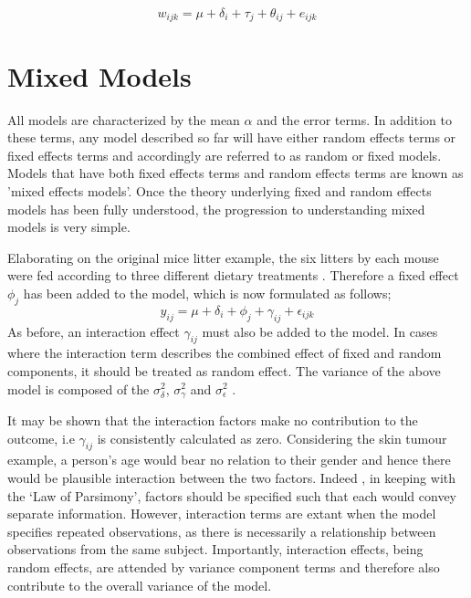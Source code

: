 \documentclass[12pt, a4paper]{report}
\theoremstyle{plain}
\theoremstyle{definition}
\theoremstyle{remark}
\begin{document}
\begin{equation}
w_{ijk} = \mu + \delta_{i} + \tau_{j} + \theta_{ij} + e_{ijk}
\end{equation}

\section{Mixed Models}


All models are characterized by the mean $\alpha$ and the error
terms. In addition to these terms, any model described so far will
have either random effects terms or fixed effects terms and
accordingly are referred to as random or fixed models. Models that
have both fixed effects terms and random effects terms are known
as 'mixed effects models'. Once the theory underlying fixed and
random effects models has been fully understood, the progression
to understanding mixed models is very simple.

Elaborating on the original mice litter example, the six litters
by each mouse were fed according to three different dietary
treatments \citep{Searle}. Therefore a fixed effect $\phi_{j}$ has
been added to the model, which is now formulated as follows;
\begin{equation}
y_{ij} = \mu + \delta_{i} + \phi_{j} + \gamma_{ij} +
\epsilon_{ijk}
\end{equation}
As before, an interaction effect $\gamma_{ij}$ must also be added
to the model. In cases where the interaction term describes the
combined effect of fixed and random components, it should be
treated as random effect. The variance of the above model is
composed of the $\sigma^{2}_{\delta}$, $\sigma^{2}_{\gamma}$ and
$\sigma^{2}_{\epsilon}$ .


It may be shown that the interaction factors make no contribution
to the outcome, i.e $\gamma_{ij}$ is consistently calculated as
zero. Considering the skin tumour example, a person's age would
bear no relation to their gender and hence there would be
plausible interaction between the two factors. Indeed , in keeping
with the `Law of Parsimony', factors should be specified such that
each would convey separate information. However, interaction terms
are extant when the model specifies repeated observations, as
there is necessarily a relationship between observations from the
same subject. Importantly, interaction effects, being random
effects, are attended by variance component terms and therefore
also contribute to the overall variance of the model.
\end{document}
